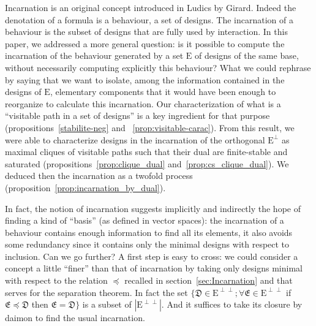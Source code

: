 \documentclass{LMCS}
\newcommand{\design}[1]{{\mathfrak{#1}}}
\newcommand{\designset}[1]{{\mathrm{#1}}}
\begin{document}
 
Incarnation is an original concept introduced in Ludics by Girard. Indeed the denotation of a formula is a behaviour, a set of designs. The incarnation of a behaviour is the subset of designs that are fully used by interaction. In this paper, we addressed a more general question: is it possible to compute the incarnation of the behaviour generated by a set $\designset{E}$ of designs of the same base, without necessarily computing explicitly this behaviour?
What we could rephrase by saying that we want to isolate, among the information contained in the designs of $\designset{E}$, elementary components that it would have been enough to reorganize to calculate this incarnation. 
Our characterization of what is a ``visitable path in a set of designs'' is a key ingredient for that purpose (propositions~\ref{stabilite-neg} and ~\ref{prop:visitable-carac}). 
From this result, we were able to characterize designs in the incarnation of the orthogonal $\designset{E}^\perp$ as maximal cliques of visitable paths such that their dual are finite-stable and saturated (propositions~\ref{prop:clique_dual} and~\ref{prop:cs_clique_dual}).
We deduced then the incarnation as a twofold process (proposition~\ref{prop:incarnation_by_dual}).

In fact, the notion of incarnation suggests implicitly and indirectly the hope of finding a kind of ``basis'' (as defined in vector spaces): the incarnation of a behaviour contains enough information to find all its elements, it also avoids some redundancy since it contains only the minimal designs with respect to inclusion. Can we go further? A first step is easy to cross: we could consider a concept a little ``finer'' than that of incarnation by taking only designs minimal with respect to the relation $\preccurlyeq$ recalled in section~\ref{sec:Incarnation} and that serves for the separation theorem. In fact the set $\{\design{D} \in \designset{E}^{\perp\perp} ; \forall \design{E} \in \designset{E}^{\perp\perp}$ if $\design{E} \preccurlyeq \design{D}$ then $\design{E} = \design{D}\}$ is a subset of $|\designset{E}^{\perp\perp}|$. 
And it suffices to take its closure by daimon to find the usual incarnation. 




\end{document}
